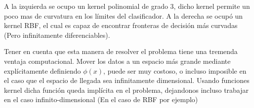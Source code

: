 A la izquierda se ocupo un kernel polinomial de grado $3$, dicho kernel permite un poco mas de curvatura en los límites del clasificador. A la derecha se ocupó un kernel RBF, el cual es capaz de encontrar fronteras de decisión más curvadas (Pero infinitamente diferenciables). 

Tener en cuenta que esta manera de resolver el problema tiene una tremenda ventaja computacional. Mover los datos a un espacio más grande mediante explícitamente definiendo $\phi(x)$, puede ser muy costoso, o incluso imposible en el caso que el espacio de llegada sea infinitamente dimensional. Usando funciones kernel dicha función queda implícita en el problema, dejandonos incluso trabajar en el caso infinito-dimensional (En el caso de RBF por ejemplo)









